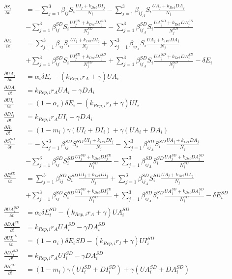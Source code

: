 \documentclass[12pt]{article}
\begin{document}
\begin{align*}
		\frac{\partial S_i}{\partial t} &= -\sum_{j=1}^3 \beta_{ij} S_i \frac{UI_j+k_{Det}DI_j}{N_j} - \sum_{j=1}^3 \beta_{ij_A} S_i \frac{UA_j+k_{Det}DA_j}{N_j} \\
		&-\sum_{j=1}^3 \beta_{ij}^{SD} S_{i} \frac{UI_{j}^{SD}+k_{Det}DI_{j}^{SD}}{N_{j}^{SD}} - \sum_{j=1}^3 \beta_{ij_A}^{SD} S_i \frac{UA_{j}^{SD}+k_{Det}DA_{j}^{SD}}{N_{j}^{SD}} \\
		\frac{\partial E_i}{\partial t} &= \sum_{j=1}^3 \beta_{ij} S_i \frac{UI_j+k_{Det}DI_j}{N_j} + \sum_{j=1}^3 \beta_{ij_A} S_i \frac{UA_j+k_{Det}DA_j}{N_j} \\
		&+\sum_{j=1}^3 \beta_{ij}^{SD} S_{i} \frac{UI_{j}^{SD}+k_{Det}DI_{j}^{SD}}{N_{j}^{SD}} + \sum_{j=1}^3 \beta_{ij_A}^{SD} S_i \frac{UA_{j}^{SD}+k_{Det}DA_{j}^{SD}}{N_{j}^{SD}}- \delta E_i \\
		\frac{\partial UA_i}{\partial t} &= \alpha_i\delta E_i  - (k_{Rep,i}r_A+\gamma) UA_i \\
		\frac{\partial DA_i}{\partial t} &= k_{Rep,i}r_A UA_i - \gamma DA_i \\
		\frac{\partial UI_i}{\partial t} &= (1-\alpha_i)\delta E_i - (k_{Rep,i}r_I + \gamma)  UI_i\\
		\frac{\partial DI_i}{\partial t} &= k_{Rep,i}r_A UI_i - \gamma DA_i\\
		\frac{\partial R_{i}}{\partial t} &= (1-m_i)\gamma (UI_i + DI_i) + \gamma (UA_i + DA_i)\\
		\frac{\partial S_i^{SD}}{\partial t} &= -\sum_{j=1}^3 \beta_{ij}^{SD} S_{i}^{SD} \frac{UI_j+k_{Det}DI_j}{N_j} - \sum_{j=1}^3 \beta_{ij_A}^{SD} S_{i}^{SD} \frac{UA_j+k_{Det}DA_j}{N_j} \\
		&-\sum_{j=1}^3 \beta_{ij}^{SD} S_{i}^{SD} \frac{UI_{j}^{SD}+k_{Det}DI_{j}^{SD}}{N_{j}^{SD}} - \sum_{j=1}^3 \beta_{ij_A}^{SD} S_{i}^{SD} \frac{UA_{j}^{SD}+k_{Det}DA_{j}^{SD}}{N_{j}^{SD}}\\
		\frac{\partial E_{i}^{SD}}{\partial t} &= \sum_{j=1}^3 \beta_{ij}^{SD} S_{i}^{SD} \frac{UI_j+k_{Det}DI_j}{N_j} + \sum_{j=1}^3 \beta_{ij_A}^{SD} S_{i}^{SD} \frac{UA_j+k_{Det}DA_j}{N_j} \\
		&+\sum_{j=1}^3 \beta_{ij}^{SD} S_{i}^{SD} \frac{UI_{j}^{SD}+k_{Det}DI_{j}^{SD}}{N_{j}^{SD}} + \sum_{j=1}^3 \beta_{ij_A}^{SD} S_{i}^{SD} \frac{UA_{j}^{SD}+k_{Det}DA_{j}^{SD}}{N_{j}^{SD}} - \delta E_{i}^{SD} \\
		\frac{\partial UA_{i}^{SD}}{\partial t} &= \alpha_i\delta E_{i}^{SD}  - (k_{Rep,i}r_A+\gamma) UA_{i}^{SD} \\
		\frac{\partial DA_{i}^{SD}}{\partial t} &= k_{Rep,i}r_A UA_{i}^{SD} - \gamma DA_{i}^{SD} \\
		\frac{\partial UI_{i}^{SD}}{\partial t} &= (1-\alpha_i)\delta E_{i}{SD} - (k_{Rep,i}r_I + \gamma)  UI_{i}^{SD}\\
		\frac{\partial DI_{i}^{SD}}{\partial t} &= k_{Rep,i}r_A UI_{i}^{SD} - \gamma DA_{i}^{SD}\\
		\frac{\partial R_{i}^{SD}}{\partial t} &= (1-m_i)\gamma (UI_{i}^{SD} + DI_{i}^{SD}) + \gamma (UA_{i}^{SD} + DA_{i}^{SD})
\end{align*}
\end{document}
